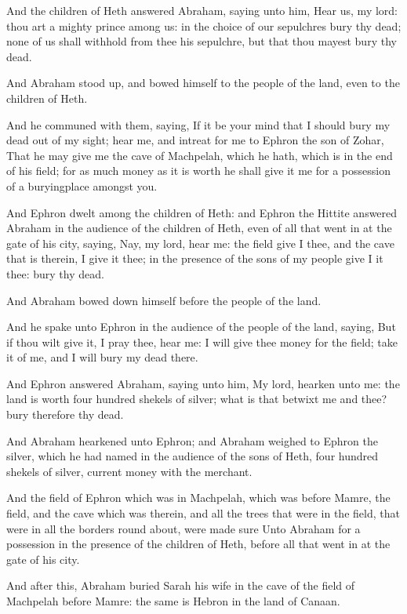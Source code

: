 \verse And the children of Heth answered Abraham, saying unto him, \verse Hear us, my lord: thou art a mighty prince among us: in the choice of our sepulchres bury thy dead; none of us shall withhold from thee his sepulchre, but that thou mayest bury thy dead.

\verse And Abraham stood up, and bowed himself to the people of the land, even to the children of Heth.

\verse And he communed with them, saying, If it be your mind that I should bury my dead out of my sight; hear me, and intreat for me to Ephron the son of Zohar, \verse That he may give me the cave of Machpelah, which he hath, which is in the end of his field; for as much money as it is worth he shall give it me for a possession of a buryingplace amongst you.

\verse And Ephron dwelt among the children of Heth: and Ephron the Hittite answered Abraham in the audience of the children of Heth, even of all that went in at the gate of his city, saying, \verse Nay, my lord, hear me: the field give I thee, and the cave that is therein, I give it thee; in the presence of the sons of my people give I it thee: bury thy dead.

\verse And Abraham bowed down himself before the people of the land.

\verse And he spake unto Ephron in the audience of the people of the land, saying, But if thou wilt give it, I pray thee, hear me: I will give thee money for the field; take it of me, and I will bury my dead there.

\verse And Ephron answered Abraham, saying unto him, \verse My lord, hearken unto me: the land is worth four hundred shekels of silver; what is that betwixt me and thee? bury therefore thy dead.

\verse And Abraham hearkened unto Ephron; and Abraham weighed to Ephron the silver, which he had named in the audience of the sons of Heth, four hundred shekels of silver, current money with the merchant.

\verse And the field of Ephron which was in Machpelah, which was before Mamre, the field, and the cave which was therein, and all the trees that were in the field, that were in all the borders round about, were made sure \verse Unto Abraham for a possession in the presence of the children of Heth, before all that went in at the gate of his city.

\verse And after this, Abraham buried Sarah his wife in the cave of the field of Machpelah before Mamre: the same is Hebron in the land of Canaan.

